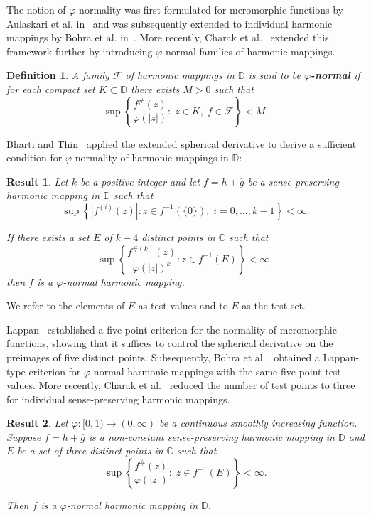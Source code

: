 \documentclass[10pt,a4paper]{amsart}
\numberwithin{equation}{section}
\newtheorem{definition}{Definition}[section]
\newtheorem{result}{Result}[section]
\begin{document}
The notion of $\varphi$-normality was first formulated for
meromorphic functions by Aulaskari et al. in~\cite{Aulaskari} and was subsequently 
extended to individual
harmonic mappings by Bohra et al. in~\cite{Bohra}. More recently, Charak et 
al.~\cite{charakbharti} extended
this framework further by introducing $\varphi$-normal families of
harmonic mappings.

\begin{definition}\cite[Definition 1.9]{charakbharti}
A family $\mathcal{F}$ of harmonic mappings in 
$\mathbb{D}$ is said to be
{\bf $\varphi$-normal} if for each compact set
$K\subset\mathbb{D}$ there exists $M>0$ such that
\[
\sup\left\{
\frac{f^{\#}(z)}{\varphi(|z|)}
:\;
z\in K,\;
f\in\mathcal{F}
\right\}
<M.
\]
\end{definition}

Bharti and Thin~\cite{bharatithin} applied the extended spherical 
derivative to derive a sufficient condition for  $\varphi$-normality 
of harmonic mappings in $\mathbb{D}$:
\begin{result}\label{Bharatik2}\cite[Theorem 1.8]{bharatithin}
  Let $k$ be a positive integer and let $f=h+\overline{g}$ be a 
  sense-preserving harmonic mapping in $\mathbb{D}$ such that
  \[\sup\left\{
|f^{(i)}(z)|:
z\in f^{-1}(\{0\}), \;
i=0,\ldots,k-1
\right\}<\infty.\]

If there exists a set $E$ of $k+4$ distinct points in $\mathbb{C}$
such that \[\sup\left\{
\frac{f^{\#(k)}(z)}{\varphi(|z|)^k}
:
z\in f^{-1}(E)
\right\}
<\infty,\] then $f$ is a $\varphi$-normal harmonic mapping.
\end{result} 
We refer to the elements of $E$ as test values and to $E$ as the test set.
\smallskip

Lappan~\cite[Theorem 1]{Lappan1974} established a five-point criterion for the 
normality of meromorphic functions, showing that it suffices to control the
 spherical derivative on the preimages of five distinct points. Subsequently,
 Bohra et al.~\cite[Theorem 5]{Bohra} obtained a Lappan-type criterion for 
$\varphi$-normal harmonic mappings with the same five-point test values. More recently, 
Charak et al.~\cite{charakbharti} reduced the number of test points to three 
for individual sense-preserving harmonic mappings.

\begin{result}\label{threevaluefunction}\cite[Theorem 1.13]{charakbharti}
Let $\varphi:[0,1)\to(0,\infty)$ be a continuous smoothly increasing
function. Suppose $f=h+\overline{g}$ is a non-constant sense-preserving
 harmonic mapping in $\mathbb{D}$ and $E$
  be a set of three distinct points in $\mathbb{C}$ such that
\[
\sup\left\{
\frac{f^{\#}(z)}{\varphi(|z|)}
:\;
z\in f^{-1}(E)
\right\}
<\infty.
\]

Then $f$ is a $\varphi$-normal harmonic mapping 
in $\mathbb{D}$.
\end{result}
\end{document}
